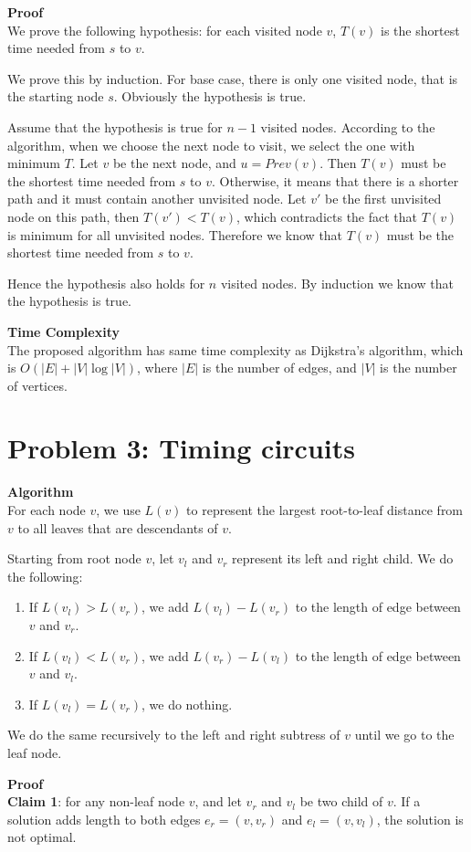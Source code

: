 \documentclass{article}
\newcommand{\Complexity}{\vspace{0.3cm} \noindent\textbf{Time Complexity} \\}
\newcommand{\Proof}{\vspace{0.3cm} \noindent\textbf{Proof} \\}
\newcommand{\Algorithm}{\textbf{Algorithm} \\}
\begin{document}
\Proof
We prove the following hypothesis: for each visited node $v$, $T(v)$ is the shortest time needed from $s$ to
$v$. 

We prove this by induction.
For base case, there is only one visited node, that is the starting node $s$. Obviously the
hypothesis is true.

Assume that the hypothesis is true for $n-1$ visited nodes. According to the algorithm, when we
choose the next node to visit, we select the one with minimum $T$. 
Let $v$ be the next node, and $u = Prev(v)$. Then $T(v)$ must be the shortest time needed from 
$s$ to $v$. 
Otherwise, it means that there is a shorter path and it must contain another unvisited node.
Let $v'$ be the first unvisited node on this path, then $T(v') < T(v)$, which
contradicts the fact that $T(v)$ is minimum for all unvisited nodes. Therefore we know that 
$T(v)$ must be the shortest time needed from $s$ to $v$.

Hence the hypothesis also holds for $n$ visited nodes. By induction we know that the hypothesis is
true.

\Complexity
The proposed algorithm has same time complexity as Dijkstra's algorithm, which is $O(|E| +
|V|\log|V|)$, where $|E|$ is the number of edges, and $|V|$ is the number of vertices.

\section*{Problem 3: Timing circuits}
\Algorithm
For each node $v$, we use $L(v)$ to represent the largest root-to-leaf distance from $v$ to 
all leaves that are descendants of $v$.

Starting from root node $v$, let $v_{l}$ and $v_{r}$ represent its left and right child. We do the
following:
\begin{enumerate}
  \item If $L(v_l) > L(v_r)$, we add $L(v_l) - L(v_r)$ to the length of edge between $v$ and $v_r$.
  \item If $L(v_l) < L(v_r)$, we add $L(v_r) - L(v_l)$ to the length of edge between $v$ and $v_l$.
  \item If $L(v_l) = L(v_r)$, we do nothing.
\end{enumerate}
We do the same recursively to the left and right subtress of $v$ until we go to the leaf node.

\Proof
\textbf{Claim 1}: for any non-leaf node $v$, and let $v_r$ and $v_l$ be two child of $v$. If a
solution adds
length to both edges $e_r = (v, v_r)$ and $e_l = (v, v_l)$, the solution is not optimal.
\end{document}
